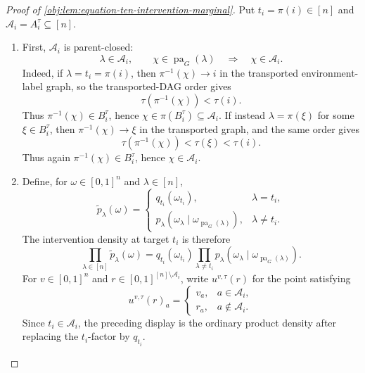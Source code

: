 \documentclass[11pt]{article}
\begin{document}
\begin{proof}[Proof of \cref{obj:lem:equation-ten-intervention-marginal}]
Put \(t_i=\pi(i)\in[n]\) and \(\mathcal A_i=A_i^\tau\subseteq[n]\).

\begin{enumerate}
\item First, \(\mathcal A_i\) is parent-closed:
\[
\lambda\in\mathcal A_i,\qquad \chi\in\operatorname{pa}_G(\lambda)
\quad\Longrightarrow\quad
\chi\in\mathcal A_i .
\]
Indeed, if \(\lambda=t_i=\pi(i)\), then \(\pi^{-1}(\chi)\to i\) in the transported environment-label graph, so the transported-DAG order gives
\[
\tau(\pi^{-1}(\chi))<\tau(i).
\]
Thus \(\pi^{-1}(\chi)\in B_i^\tau\), hence \(\chi\in\pi(B_i^\tau)\subseteq\mathcal A_i\). If instead \(\lambda=\pi(\xi)\) for some \(\xi\in B_i^\tau\), then \(\pi^{-1}(\chi)\to \xi\) in the transported graph, and the same order gives
\[
\tau(\pi^{-1}(\chi))<\tau(\xi)<\tau(i).
\]
Thus again \(\pi^{-1}(\chi)\in B_i^\tau\), hence \(\chi\in\mathcal A_i\). %

\item Define, for \(\omega\in[0,1]^n\) and \(\lambda\in[n]\),
\[
\widetilde p_\lambda(\omega)
=
\begin{cases}
q_{t_i}(\omega_{t_i}), & \lambda=t_i,\\
p_\lambda\!\left(\omega_\lambda\mid
\omega_{\operatorname{pa}_G(\lambda)}\right), & \lambda\ne t_i .
\end{cases}
\]
The intervention density at target \(t_i\) is therefore
\[
\prod_{\lambda\in[n]}\widetilde p_\lambda(\omega)
=
q_{t_i}(\omega_{t_i})
\prod_{\lambda\ne t_i}
p_\lambda\!\left(\omega_\lambda\mid
\omega_{\operatorname{pa}_G(\lambda)}\right).
\]
For \(v\in[0,1]^n\) and \(r\in[0,1]^{[n]\setminus\mathcal A_i}\), write \(u^{v,\tau}(r)\) for the point satisfying
\[
u^{v,\tau}(r)_a=
\begin{cases}
v_a, & a\in\mathcal A_i,\\
r_a, & a\notin\mathcal A_i .
\end{cases}
\]
Since \(t_i\in\mathcal A_i\), the preceding display is the ordinary product density after replacing the \(t_i\)-factor by \(q_{t_i}\).


\end{enumerate}
\end{proof}
\end{document}
